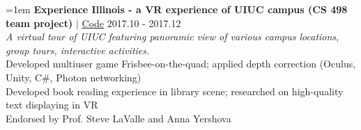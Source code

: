 \documentclass[10pt]{article}
\begin{document}
\hangindent=1em
\textbf{Experience Illinois - a VR experience of UIUC campus (CS 498 team project)} $|$ \href{https://github.com/liujch1998/Illinois-Experience}{Code} \hfill 2017.10 - 2017.12 \\
\textit{A virtual tour of UIUC featuring panoramic view of various campus locations, group tours, interactive activities. } \\
Developed multiuser game Frisbee-on-the-quad; applied depth correction (Oculus, Unity, C\#, Photon networking) \\
Developed book reading experience in library scene; researched on high-quality text displaying in VR \\
Endorsed by Prof. Steve LaValle and Anna Yershova
\end{document}
